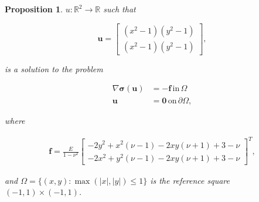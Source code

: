 \documentclass[11pt,a4paper,english]{elsarticle}%
\newtheorem{proposition}[theorem]{Proposition}
\begin{document}
\begin{proposition}
    $u: \mathbb{R}^2 \rightarrow \mathbb{R}$ such that

    \begin{equation} \bm u =
        \begin{bmatrix}
            (x^2-1)(y^2-1) \\
            (x^2-1)(y^2-1)
        \end{bmatrix},
    \end{equation}

    is a solution to the problem

    \begin{align*}
        \nabla \bm \sigma (\bm u) &= -\bm f \, \text{in} \, \Omega \\
        \bm u &= \bm 0 \, \text{on} \, \partial \Omega,
    \end{align*}

    where

    \begin{align*}
        \bm f = \frac{E}{1-\nu^2}   
        \begin{bmatrix}
            -2y^2 + x^2(\nu - 1) -2xy(\nu +1) + 3 - \nu \\
            -2x^2 + y^2(\nu - 1) -2xy(\nu +1) + 3 - \nu 
        \end{bmatrix}^T,
    \end{align*}

    and $\Omega = \{ (x,y) : \max (|x|,|y|) \leq 1 \}$ is the reference square $(-1,1) \times (-1,1)$.

\end{proposition}
\end{document}
